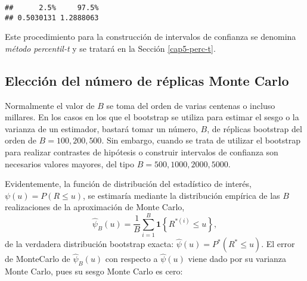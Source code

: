 \documentclass[
]{book}
\newenvironment{Shaded}{\begin{snugshade}}{\end{snugshade}}
\newcommand{\CommentTok}[1]{\textcolor[rgb]{0.56,0.35,0.01}{\textit{#1}}}
\newcommand{\DecValTok}[1]{\textcolor[rgb]{0.00,0.00,0.81}{#1}}
\newcommand{\KeywordTok}[1]{\textcolor[rgb]{0.13,0.29,0.53}{\textbf{#1}}}
\newcommand{\NormalTok}[1]{#1}
\newcommand{\OperatorTok}[1]{\textcolor[rgb]{0.81,0.36,0.00}{\textbf{#1}}}
\newcommand{\StringTok}[1]{\textcolor[rgb]{0.31,0.60,0.02}{#1}}
\theoremstyle{definition}
\theoremstyle{definition}
\theoremstyle{definition}
\theoremstyle{remark}
\begin{document}
\begin{Shaded}
\end{Shaded}

\begin{verbatim}
##      2.5%     97.5% 
## 0.5030131 1.2888063
\end{verbatim}

Este procedimiento para la construcción de intervalos de confianza
se denomina \emph{método percentil-t} y se tratará en la Sección \ref{cap5-perc-t}.

\hypertarget{elecciuxf3n-del-nuxfamero-de-ruxe9plicas-monte-carlo}{%
\subsection{Elección del número de réplicas Monte Carlo}\label{elecciuxf3n-del-nuxfamero-de-ruxe9plicas-monte-carlo}}

Normalmente el valor de \(B\) se toma del orden de varias centenas o
incluso millares. En los casos en los que el bootstrap se utiliza para
estimar el sesgo o la varianza de un estimador, bastará tomar un número,
\(B\), de réplicas bootstrap del orden de \(B = 100, 200, 500\). Sin embargo,
cuando se trata de utilizar el bootstrap para realizar contrastes de
hipótesis o construir intervalos de confianza son necesarios valores
mayores, del tipo \(B = 500, 1000, 2000, 5000\).

Evidentemente, la función de distribución del estadístico de interés,
\(\psi \left( u \right) =P\left( R\leq u \right)\), se estimaría mediante
la distribución empírica de las \(B\) realizaciones de la aproximación de
Monte Carlo,
\[\hat{\psi}_{B}\left( u \right) =
\frac{1}{B}\sum_{i=1}^{B}\mathbf{1}\left\{ R^{\ast (i)}\leq u\right\},\]
de la verdadera distribución bootstrap exacta:
\(\hat{\psi}\left(u \right) =P^{\ast}\left( R^{\ast}\leq u \right)\).
El error de MonteCarlo de \(\hat{\psi}_{B}\left( u \right)\) con respecto
a \(\hat{\psi}\left( u \right)\) viene dado por su varianza Monte Carlo,
pues su sesgo Monte Carlo es cero:
\end{document}
